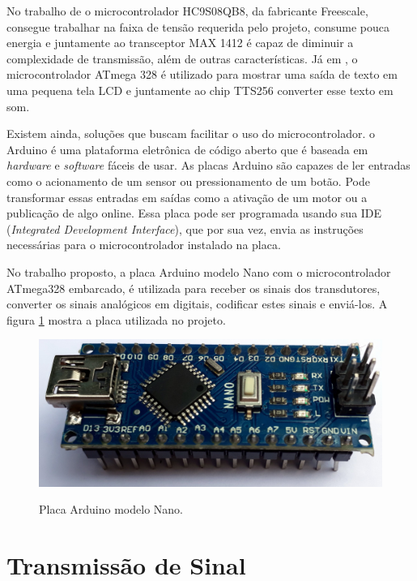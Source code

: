 \documentclass[
	12pt,				%
	openright,			%
	oneside,			%
	a4paper,			%
	english,			%
	brazil				%
	]{abntex2}
\begin{document}
		No trabalho de \cite{michela2013rehab} o microcontrolador HC9S08QB8, da fabricante Freescale, consegue trabalhar na faixa de tensão requerida pelo projeto, consume pouca energia e juntamente ao transceptor MAX 1412 é capaz de diminuir a complexidade de transmissão, além de outras características. Já em \cite{anbarasi2013deafmute}, o microcontrolador ATmega 328 é utilizado para mostrar uma saída de texto em uma pequena tela LCD e juntamente ao chip TTS256 converter esse texto em som.

		Existem ainda, soluções que buscam facilitar o uso do microcontrolador. o Arduino é uma plataforma eletrônica de código aberto que é baseada em \textit{hardware} e \textit{software} fáceis de usar. As placas Arduino são capazes de ler entradas como o acionamento de um sensor ou pressionamento de um botão. Pode transformar essas entradas em saídas como a ativação de um motor ou a publicação de algo online. Essa placa pode ser programada usando sua IDE (\textit{Integrated Development Interface}), que por sua vez, envia as instruções necessárias para o microcontrolador instalado na placa.\cite{arduinosite} 

		No trabalho proposto, a placa Arduino modelo Nano com o microcontrolador ATmega328 embarcado, é utilizada para receber os sinais dos transdutores, converter os sinais analógicos em digitais, codificar estes sinais e enviá-los. A figura \ref{Fig:arduino-nano1} mostra a placa utilizada no projeto.
		
		\begin{figure}[h!]
			\centering
			\caption{Placa Arduino modelo Nano.}
  		\includegraphics[width=12cm]{./figures/arduino-nano1.jpg}
  		\label{Fig:arduino-nano1}
		\end{figure}


		\section{Transmissão de Sinal}
		
\end{document}
